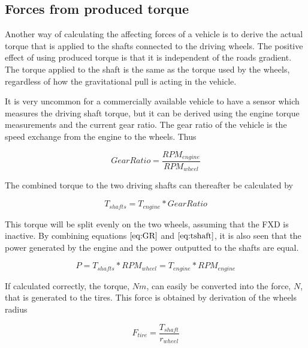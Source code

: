\subsection{Forces from produced torque}

Another way of calculating the affecting forces of a vehicle is to derive the actual torque that is applied to the shafts connected to the driving wheels. The positive effect of using produced torque is that it is independent of the roads gradient. The torque applied to the shaft is the same as the torque used by the wheels, regardless of how the gravitational pull is acting in the vehicle. 

It is very uncommon for a commercially available vehicle to have a sensor which measures the driving shaft torque, but it can be derived using the engine torque measurements and the current gear ratio. The gear ratio of the vehicle is the speed exchange from the engine to the wheels. Thus

\begin{equation}
	\label{eq:GR}
	Gear Ratio = \frac{RPM_{engine}}{RPM_{wheel}}
\end{equation}
	
	
The combined torque to the two driving shafts can thereafter be calculated by

\begin{equation}
	\label{eq:tshaft}
	T_{shafts} = T_{engine}*Gear Ratio
\end{equation}

This torque will be split evenly on the two wheels, assuming that the FXD is inactive. By combining equations $ \ref{eq:GR} $ and $ \ref{eq:tshaft} $, it is also seen that the power generated by the engine and the power outputted to the shafts are equal.

\begin{equation}
	P = T_{shafts}*RPM_{wheel} = T_{engine}*RPM_{engine}
\end{equation}

If calculated correctly, the torque, $ Nm $, can easily be converted into the force, $ N $, that is generated to the tires. This force is obtained by derivation of the wheels radius

\begin{equation}
F_{tire} = \frac{T_{shaft}}{r_{wheel}}
\end{equation}